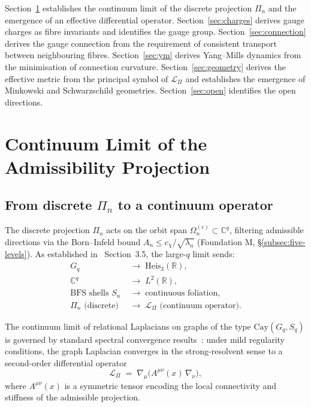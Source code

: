 \documentclass[11pt,a4paper]{article}
\begin{document}
      Section~\ref{sec:continuum} establishes the continuum limit of the discrete
      projection $\Pi_n$ and the emergence of an effective differential operator.
      Section~\ref{sec:charges} derives gauge charges as fibre invariants and
      identifies the gauge group.
      Section~\ref{sec:connection} derives the gauge connection from the requirement
      of consistent transport between neighbouring fibres.
      Section~\ref{sec:ym} derives Yang--Mills dynamics from the minimisation of
      connection curvature.
      Section~\ref{sec:geometry} derives the effective metric from the principal
      symbol of $\mathcal{L}_\Pi$ and establishes the emergence of Minkowski and
      Schwarzschild geometries.
      Section~\ref{sec:open} identifies the open directions.

  \section{Continuum Limit of the Admissibility Projection}
    \label{sec:continuum}

    \subsection{From discrete $\Pi_n$ to a continuum operator}

      The discrete projection $\Pi_n$ acts on the orbit span
      $\Omega_n^{(c)} \subset \mathbb{C}^q$, filtering admissible directions via the
      Born--Infeld bound $A_n \leq c_\chi/\sqrt{\lambda_n}$ (Foundation M,
      §\ref{subsec:five-levels}).
      As established in~\cite{FoundationM} Section~3.5, the large-$q$ limit sends:
      \begin{align}
        G_q &\;\longrightarrow\; \mathrm{Heis}_3(\mathbb{R}),\\
        \mathbb{C}^q &\;\longrightarrow\; L^2(\mathbb{R}),\\
        \text{BFS shells } S_n &\;\longrightarrow\; \text{continuous foliation},\\
        \Pi_n \text{ (discrete)} &\;\longrightarrow\; \mathcal{L}_\Pi \text{ (continuum operator)}.
      \end{align}

      The continuum limit of relational Laplacians on graphs of the type
      $\mathrm{Cay}(G_q, S_q)$ is governed by standard spectral convergence
      results~\cite{BornInfeld}: under mild regularity conditions, the graph Laplacian
      converges in the strong-resolvent sense to a second-order differential operator
      \begin{equation}
        \label{eq:continuum-op}
        \mathcal{L}_\Pi \;=\; \nabla_\mu\bigl(A^{\mu\nu}(x)\,\nabla_\nu\bigr),
      \end{equation}
      where $A^{\mu\nu}(x)$ is a symmetric tensor encoding the local connectivity
      and stiffness of the admissible projection.
\end{document}
